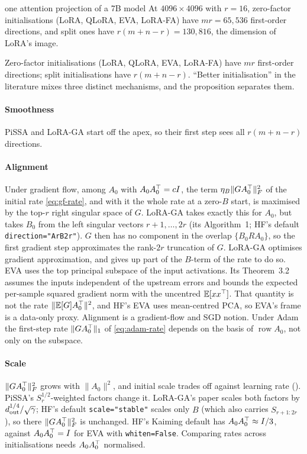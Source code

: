 \begin{example*}{one attention projection of a 7B model}
At $4096\times4096$ with $r=16$, zero-factor initialisations (LoRA, QLoRA, EVA, LoRA-FA) have $mr=65{,}536$ first-order
directions, and split ones have $r(m+n-r)=130{,}816$, the dimension of LoRA's image.
\end{example*}

\begin{explains}
Zero-factor initialisations (LoRA, QLoRA, EVA, LoRA-FA) have $mr$ first-order directions; split initialisations have
$r(m+n-r)$. ``Better initialisation'' in the literature mixes three distinct mechanisms, and the proposition separates
them.
\end{explains}

\paragraph{Smoothness} PiSSA and LoRA-GA start off the apex, so their first step sees all $r(m+n-r)$ directions.

\paragraph{Alignment} Under gradient flow, among $A_0$ with $A_0A_0^{\top}=cI$, the term $\eta_B\|GA_0^{\top}\|_F^2$ of the
initial rate \eqref{eq:gf-rate}, and with it the whole rate at a zero-$B$ start, is maximised by the top-$r$ right
singular space of $G$. LoRA-GA takes exactly this for $A_0$, but takes $B_0$ from the left singular vectors
$r+1,\dots,2r$ (its Algorithm~1; HF's default \texttt{direction="ArB2r"}). $G$ then has no component in the overlap
$\{B_0RA_0\}$, so the first gradient step approximates the rank-$2r$ truncation of $G$. LoRA-GA optimises gradient
approximation, and gives up part of the $B$-term of the rate to do so. EVA uses the top principal subspace of the input
activations. Its Theorem~3.2 assumes the inputs independent of the upstream errors and bounds the expected per-sample
squared gradient norm with the uncentred $\mathbb E[xx^{\top}]$. That quantity is not the rate $\|\mathbb E[G]A_0^{\top}\|^2$, and
HF's EVA uses mean-centred PCA, so EVA's frame is a data-only proxy. Alignment is a gradient-flow and SGD notion. Under
Adam the first-step rate $\|GA_0^{\top}\|_1$ of \eqref{eq:adam-rate} depends on the basis of $\operatorname{row}A_0$, not
only on the subspace.

\paragraph{Scale} $\|GA_0^{\top}\|_F^2$ grows with $\|A_0\|^2$, and initial scale trades off against learning rate
(). PiSSA's $S_r^{1/2}$-weighted factors change it. LoRA-GA's paper scales both factors by
$d_{\rm out}^{1/4}/\sqrt\gamma$; HF's default \texttt{scale="stable"} scales only $B$ (which also carries
$S_{r+1:2r}$), so there $\|GA_0^{\top}\|_F^2$ is unchanged. HF's Kaiming default has $A_0A_0^{\top}\approx I/3$, against
$A_0A_0^{\top}=I$ for EVA with \texttt{whiten=False}. Comparing rates across initialisations needs $A_0A_0^{\top}$ normalised.

